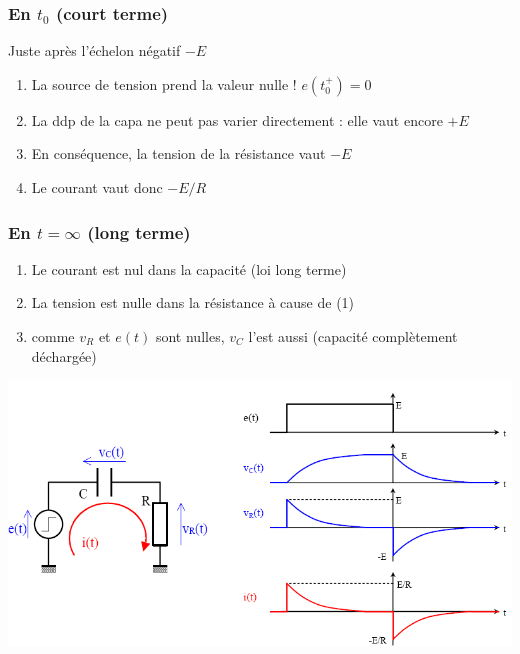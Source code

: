 \documentclass	[11pt, a4paper, openany]{book}
\begin{document}
\subsubsection{En $t_0$ (court terme)}
Juste après l'échelon négatif $-E$
\begin{enumerate}
\item La source de tension prend la valeur nulle ! $e(t_0^+) = 0$
\item La ddp de la capa ne peut pas varier directement : elle vaut encore $+E$
\item En conséquence, la tension de la résistance vaut $-E$
\item Le courant vaut donc $-E/R$
\end{enumerate}

\subsubsection{En $t = \infty$ (long terme)}
\begin{enumerate}
\item Le courant est nul dans la capacité (loi long terme)
\item La tension est nulle dans la résistance à cause de (1)
\item comme $v_R$ et $e(t)$ sont nulles, $v_C$ l'est aussi (capacité complètement déchargée)
\end{enumerate}
\begin{center}
\includegraphics[scale=0.4]{img/image12.png}
\end{center}
\end{document}
